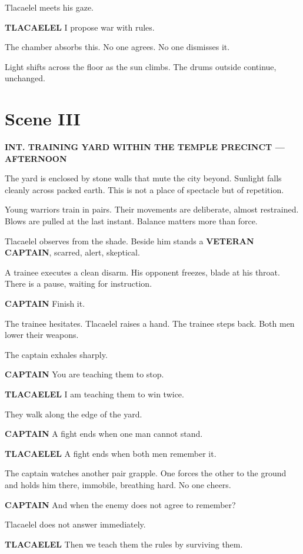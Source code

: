 \documentclass[12pt]{article}
\begin{document}
Tlacaelel meets his gaze.

\textbf{TLACAELEL}  
I propose war with rules.

The chamber absorbs this. No one agrees. No one dismisses it.

Light shifts across the floor as the sun climbs. The drums outside continue, unchanged.

\section*{Scene III}

\textbf{INT. TRAINING YARD WITHIN THE TEMPLE PRECINCT --- AFTERNOON}

The yard is enclosed by stone walls that mute the city beyond. Sunlight falls cleanly across packed earth. This is not a place of spectacle but of repetition.

Young warriors train in pairs. Their movements are deliberate, almost restrained. Blows are pulled at the last instant. Balance matters more than force.

Tlacaelel observes from the shade. Beside him stands a \textbf{VETERAN CAPTAIN}, scarred, alert, skeptical.

A trainee executes a clean disarm. His opponent freezes, blade at his throat. There is a pause, waiting for instruction.

\textbf{CAPTAIN}  
Finish it.

The trainee hesitates. Tlacaelel raises a hand. The trainee steps back. Both men lower their weapons.

The captain exhales sharply.

\textbf{CAPTAIN}  
You are teaching them to stop.

\textbf{TLACAELEL}  
I am teaching them to win twice.

They walk along the edge of the yard.

\textbf{CAPTAIN}  
A fight ends when one man cannot stand.

\textbf{TLACAELEL}  
A fight ends when both men remember it.

The captain watches another pair grapple. One forces the other to the ground and holds him there, immobile, breathing hard. No one cheers.

\textbf{CAPTAIN}  
And when the enemy does not agree to remember?

Tlacaelel does not answer immediately.

\textbf{TLACAELEL}  
Then we teach them the rules by surviving them.
\end{document}
